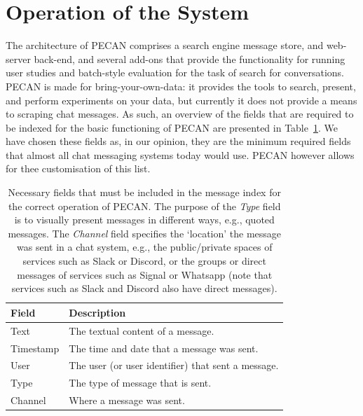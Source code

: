 \graphicspath{ {./images/} }

\vspace{-8pt}
\section{Operation of the System}

The architecture of PECAN comprises a search engine message store, and web-server back-end, and several add-ons that provide the functionality for running user studies and batch-style evaluation for the task of search for conversations. PECAN is made for bring-your-own-data: it provides the tools to search, present, and perform experiments on your data, but currently it does not provide a means to scraping chat messages. As such, an overview of the fields that are required to be indexed for the basic functioning of PECAN are presented in Table~\ref{table:fields}. We have chosen these fields as, in our opinion, they are the minimum required fields that almost all chat messaging systems today would use. PECAN however allows for thee customisation of this list.

\begin{table}
\centering
\begin{tabular}{ll}
	\hline
	Field     & Description                                        \\ \hline
	Text      & The textual content of a message.                  \\
	Timestamp & The time and date that a message was sent.         \\
	User      & The user (or user identifier) that sent a message. \\
	Type      & The type of message that is sent.                  \\
	Channel   & Where a message was sent.                          \\ \hline
\end{tabular}
\caption{Necessary fields that must be included in the message index for the correct operation of PECAN. The purpose of the \textit{Type} field is to visually present messages in different ways, e.g., quoted messages. The \textit{Channel} field specifies the `location' the message was sent in a chat system, e.g., the public/private spaces of services such as Slack or Discord, or the groups or direct messages of services such as Signal or Whatsapp (note that services such as Slack and Discord also have direct messages).\vspace{-8pt}}
\label{table:fields}
\end{table}


